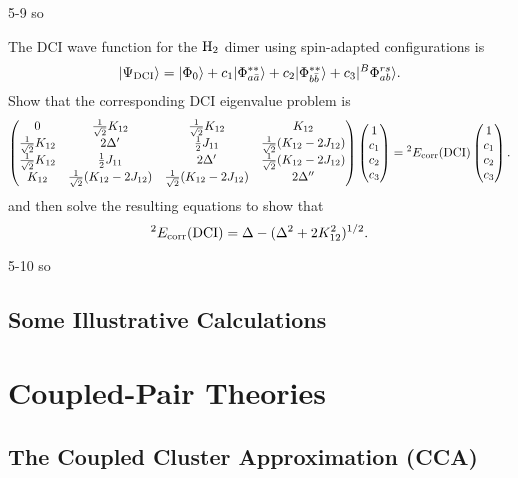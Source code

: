 \documentclass[a4paper]{book}
\newcommand{\corr}{{\rm corr}}
\newcommand{\DCI}{{\rm DCI}}
\begin{document}
	\begin{solution}
		5-9 so
	\end{solution}
	
	\begin{exercise}
	The DCI wave function for the $\ce{H2}$ dimer using spin-adapted configurations is
	\[
		| \Psi_{\DCI} \rangle = | \Phi_0 \rangle + c_1 | \Phi^{**}_{a\bar{a}} \rangle + c_2 | \Phi^{**}_{b \bar{b}} \rangle + c_3 | {}^{B}\Phi^{rs}_{ab} \rangle .
	\]
	Show that the corresponding DCI eigenvalue problem is
	\[
	\begin{pmatrix}
		0 & \frac{1}{\sqrt{2}}K_{12} & \frac{1}{\sqrt{2}} K_{12} & K_{12} \\
		\frac{1}{\sqrt{2}}K_{12} & 2\Delta^\prime & \frac{1}{2}J_{11} & \frac{1}{\sqrt{2}}(K_{12} - 2 J_{12}) \\
		\frac{1}{\sqrt{2}}K_{12} & \frac{1}{2}J_{11} & 2\Delta^\prime & \frac{1}{\sqrt{2}}(K_{12} - 2 J_{12}) \\
		K_{12} & \frac{1}{\sqrt{2}}(K_{12} - 2J_{12}) & \frac{1}{\sqrt{2}}(K_{12} - 2J_{12}) & 2\Delta^{\prime\prime}
	\end{pmatrix} \begin{pmatrix}
	1 \\ c_1 \\ c_2 \\ c_3
	\end{pmatrix} = {}^2 E_\corr (\DCI) \begin{pmatrix}
	1 \\ c_1 \\ c_2 \\ c_3
	\end{pmatrix}.
	\]
	and then solve the resulting equations to show that
	\[
		{}^2 E_\corr (\DCI) = \Delta - ( \Delta^2 + 2 K^2_{12} )^{1/2}.
	\]
	\end{exercise}
	
	\begin{solution}
		5-10 so
	\end{solution}
	
	\subsection{Some Illustrative Calculations}
	
	\section{Coupled-Pair Theories}
	
	\subsection{The Coupled Cluster Approximation (CCA)}
	
\end{document}
